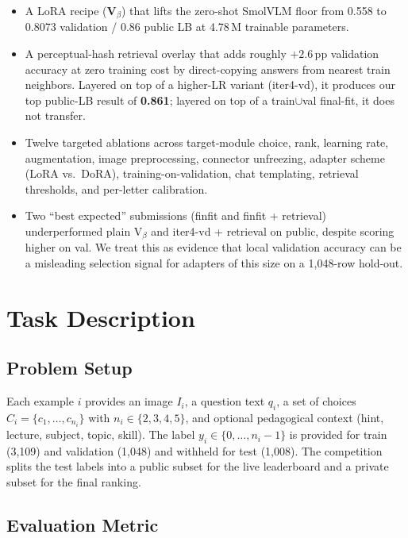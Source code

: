 \documentclass[11pt]{article}
\begin{document}
\begin{itemize}
  \item A LoRA recipe (\textbf{V$_\beta$}) that lifts the zero-shot SmolVLM floor from 0.558 to 0.8073 validation / 0.86 public LB at 4.78\,M trainable parameters.
  \item A perceptual-hash retrieval overlay that adds roughly $+2.6$\,pp validation accuracy at zero training cost by direct-copying answers from nearest train neighbors. Layered on top of a higher-LR variant (iter4-vd), it produces our top public-LB result of \textbf{0.861}; layered on top of a train$\cup$val final-fit, it does not transfer.
  \item Twelve targeted ablations across target-module choice, rank, learning rate, augmentation, image preprocessing, connector unfreezing, adapter scheme (LoRA vs.\ DoRA), training-on-validation, chat templating, retrieval thresholds, and per-letter calibration.
  \item Two ``best expected'' submissions (finfit and finfit + retrieval) underperformed plain V$_\beta$ and iter4-vd + retrieval on public, despite scoring higher on val. We treat this as evidence that local validation accuracy can be a misleading selection signal for adapters of this size on a 1{,}048-row hold-out.
\end{itemize}

\section{Task Description}

\subsection{Problem Setup}

Each example $i$ provides an image $I_i$, a question text $q_i$, a set of choices $C_i = \{c_1, \ldots, c_{n_i}\}$ with $n_i \in \{2, 3, 4, 5\}$, and optional pedagogical context (hint, lecture, subject, topic, skill). The label $y_i \in \{0, \ldots, n_i-1\}$ is provided for train (3{,}109) and validation (1{,}048) and withheld for test (1{,}008). The competition splits the test labels into a public subset for the live leaderboard and a private subset for the final ranking.

\subsection{Evaluation Metric}
\end{document}
